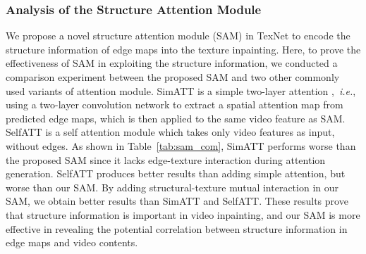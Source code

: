 \subsubsection{Analysis of the Structure Attention Module}
We propose a novel structure attention module (SAM) in TexNet to encode the structure information of edge maps into the texture inpainting. 
{\color{blue}
Here, to prove the effectiveness of SAM in exploiting the structure information, we conducted a comparison experiment between the proposed SAM and two other commonly used variants of attention module. SimATT is a simple two-layer attention \cite{min2019two},~\emph{i.e.}, using a two-layer convolution network to extract a spatial attention map from predicted edge maps, which is then applied to the same video feature as SAM. SelfATT is a self attention module \cite{vaswani2017attention} which takes only video features as input, without edges. 
As shown in Table~\ref{tab:sam_com}, SimATT performs worse than the proposed SAM since it lacks edge-texture interaction during attention generation. SelfATT produces better results than adding simple attention, but worse than our SAM. By adding structural-texture mutual interaction in our SAM, we obtain better results than SimATT and SelfATT. These results prove that structure information is important in video inpainting, and our SAM is more effective in revealing the potential correlation between structure information in edge maps and video contents.	
}



